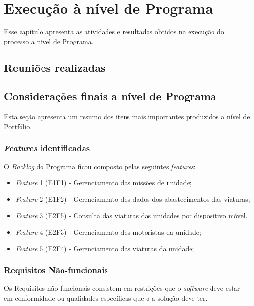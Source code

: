 \chapter{Execução à nível de Programa}

  Esse capítulo apresenta as atividades e resultados obtidos na execução do processo a nível de Programa.
  
  \section{Reuniões realizadas}
  
  \section{Considerações finais a nível de Programa}
    
    Esta seção apresenta um resumo dos itens mais importantes produzidos a nível de Portfólio.
    
    \subsection{\textit{Features} identificadas}
      
      O \textit{Backlog} do Programa ficou composto pelas seguintes \textit{features}:
      
      \begin{itemize}
       \item \textit{Feature} 1 (E1F1) - Gerenciamento das missões de unidade;
       \item \textit{Feature} 2 (E1F2) - Gerenciamento dos dados dos abastecimentos das viaturas;
       \item \textit{Feature} 3 (E2F5) - Consulta das viaturas das unidades por dispositivo móvel. 
       \item \textit{Feature} 4 (E2F3) - Gerenciamento dos motoristas da unidade;
       \item \textit{Feature} 5 (E2F4) - Gerenciamento das viaturas da unidade;
      \end{itemize}
      
      
    \subsection{Requisitos Não-funcionais}
    
          Os Requisitos não-funcionais consistem em restrições que o \textit{software} deve estar em conformidade ou qualidades específicas
          que o a solução deve ter. \cite{leffingwell14}
      
